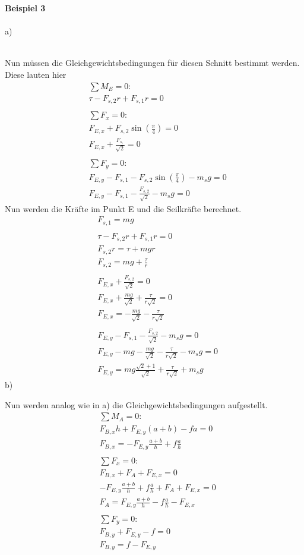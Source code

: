 \newpage
\noindent
\textbf{Beispiel 3} \\ \\
a)
\vspace{-15pt}

\\ 
Nun müssen die Gleichgewichtsbedingungen für diesen Schnitt bestimmt werden. Diese lauten hier
\begin{align*}
	&\sum M_E = 0: \\
	&\tau -F_{s,2}r + F_{s,1}r = 0 \\
	\\
	&\sum F_x = 0: \\
	&F_{E,x} + F_{s,2}\sin\left(\frac{\pi}{4}\right) = 0 \\
	&F_{E,x} + \frac{F_{s,}}{\sqrt{2}}= 0 \\
	\\
	&\sum F_y = 0:\\
	&F_{E,y} - F_{s,1} - F_{s,2}\sin\left(\frac{\pi}{4}\right) - m_sg = 0\\
	&F_{E,y} - F_{s,1} - \frac{F_{s,2}}{\sqrt{2}} - m_sg = 0
\end{align*}
\newpage
Nun werden die Kräfte im Punkt E und die Seilkräfte berechnet.
\begin{align*}
	&F_{s,1} = mg \\
	\\
	&\tau -F_{s,2}r + F_{s,1}r = 0 \\
	& F_{s,2} r = \tau + m g r \\
	& F_{s,2} = mg + \frac{\tau}{r} \\
	\\
	&F_{E,x} + \frac{F_{s,2}}{\sqrt{2}}= 0 \\
	&F_{E,x} + \frac{mg}{\sqrt{2}} + \frac{\tau}{r\sqrt{2}} = 0 \\
	&F_{E,x} = - \frac{mg}{\sqrt{2}} - \frac{\tau}{r\sqrt{2}} \\
	\\
	&F_{E,y} - F_{s,1} - \frac{F_{s,2}}{\sqrt{2}} - m_sg = 0 \\
	&F_{E,y} - mg - \frac{mg}{\sqrt{2}} - \frac{\tau}{r\sqrt{2}} - m_sg = 0 \\
	&F_{E,y} = mg \frac{\sqrt{2} + 1}{\sqrt{2}} + \frac{\tau}{r\sqrt{2}} + m_sg
\end{align*}
b)

\newpage
Nun werden analog wie in a) die Gleichgewichtsbedingungen aufgestellt.
\begin{align*}
	&\sum M_A = 0: \\
	& F_{B,x}h + F_{E,y} \left(a + b\right) -fa = 0 \\
	& F_{B,x} = - F_{E,y}\frac{a+b}{h} + f\frac{a}{h} \\%
	\\
	&\sum F_x = 0:\\
	&F_{B,x} + F_A +F_{E,x} = 0\\
	&-F_{E,y}\frac{a + b}{h} + f \frac{a}{h} + F_A + F_{E,x} = 0 \\
	&F_A = F_{E,y}\frac{a + b}{h} - f\frac{a}{h} - F_{E,x}  \\
	\\
	&\sum F_y = 0: \\
	&F_{B,y} + F_{E,y} - f = 0 \\
	&F_{B,y} = f - F_{E,y}
\end{align*}
